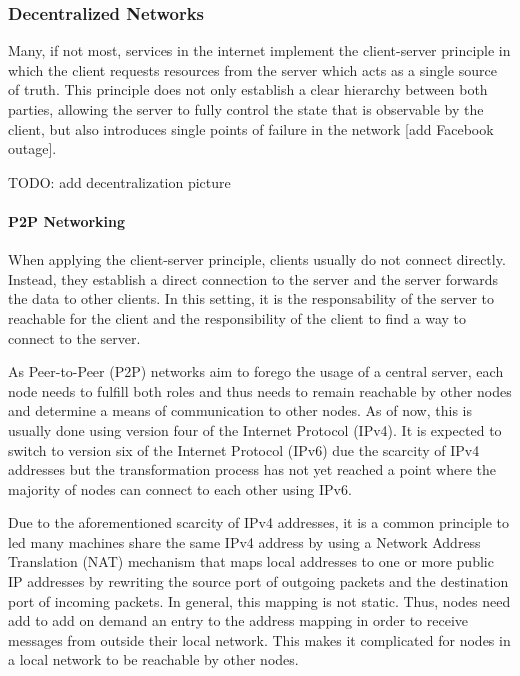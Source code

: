 \subsubsection{Decentralized Networks}
\label{sec:intro:stateoftheart:p2pnetworks}

Many, if not most, services in the internet implement the client-server principle in which the client requests resources from the server which acts as a single source of truth. This principle does not only establish a clear hierarchy between both parties, allowing the server to fully control the state that is observable by the client, but also introduces single points of failure in the network [add Facebook outage].

TODO: add decentralization picture

\paragraph{P2P Networking}

When applying the client-server principle, clients usually do not connect directly. Instead, they establish a direct connection to the server and the server forwards the data to other clients. In this setting, it is the responsability of the server to reachable for the client and the responsibility of the client to find a way to connect to the server.

As Peer-to-Peer (P2P) networks aim to forego the usage of a central server, each node needs to fulfill both roles and thus needs to remain reachable by other nodes and determine a means of communication to other nodes. As of now, this is usually done using version four of the Internet Protocol (IPv4). It is expected to switch to version six of the Internet Protocol (IPv6) due the scarcity of IPv4 addresses but the transformation process has not yet reached a point where the majority of nodes can connect to each other using IPv6.

Due to the aforementioned scarcity of IPv4 addresses, it is a common principle to led many machines share the same IPv4 address by using a Network Address Translation (NAT) mechanism that maps local addresses to one or more public IP addresses by rewriting the source port of outgoing packets and the destination port of incoming packets. In general, this mapping is not static. Thus, nodes need add to add on demand an entry to the address mapping in order to receive messages from outside their local network. This makes it complicated for nodes in a local network to be reachable by other nodes.

